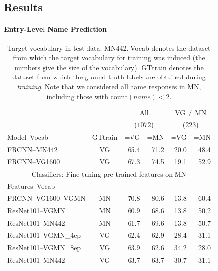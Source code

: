 \subsection{Results}
\label{sect:exp_results}

\paragraph{Entry-Level Name Prediction}

\begin{table}[t]
	\centering
	\small
	\begin{tabular}{l@{~}|@{~}c@{~}|@{~}r@{~}r@{~}|@{~}r@{~}r@{~}}
		\toprule
		&  & \multicolumn{2}{c}{All} 
		& \multicolumn{2}{c}{VG$\neq$MN}\\
		&  & \multicolumn{2}{c}{($1072$)} 
		& \multicolumn{2}{c}{($223$)}\\	
		Model--Vocab	 
		&  GTtrain &  =VG & =MN 
		&  =VG & =MN \\ 
		\midrule
		FRCNN--MN442 & VG &  65.4 &      71.2 &   20.0 &      48.4  \\
		FRCNN--VG1600 & VG &    67.3 &      74.5 &    19.1 &      52.9  \\
		\midrule \midrule
		\multicolumn{6}{c}{Classifiers: Fine-tuning pre-trained features on MN}\\
		Features--Vocab &   \\
		\midrule 
		FRCNN--VG1600--VGMN & MN &    70.8 &      80.6 &    13.8 &      60.4  \\ 
		\midrule
		ResNet101--VGMN & MN  & 60.9 &  68.6 &  13.8 & 50.2  \\
		
		ResNet101--MN442 & MN &            61.7 &              69.6 &                        13.8 &              50.7 \\
		ResNet101--VGMN\_4ep  &   VG &  62.4 &              62.9 &              28.4 &              31.1  \\
		ResNet101--VGMN\_8ep & VG &            63.9 &              62.6 &          34.2 &              28.0 \\
		ResNet101--MN442 & VG  &            63.7 &              63.7 &                  30.7 &              31.1  \\
		\bottomrule
	\end{tabular}
	\caption{Target vocabulary in test data: MN442. Vocab denotes the dataset from which the target vocabulary for training was induced (the numbers give the size of the vocabulary). GTtrain denotes the dataset from which the ground truth labels are obtained during \textit{training}. Note that we considered all name responses in MN, including those with $\text{count}(name)<2$\label{tab:exp_VGvsMN}. }
\end{table}


